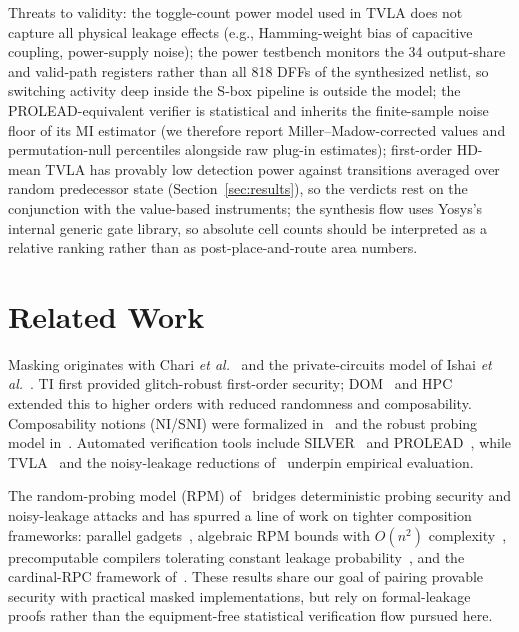 \documentclass[lettersize,journal]{IEEEtran}
\begin{document}
Threats to validity: the toggle-count power model used in TVLA does
not capture all physical leakage effects (e.g., Hamming-weight bias
of capacitive coupling, power-supply noise); the power testbench
monitors the 34 output-share and valid-path registers
rather than all 818 DFFs of the synthesized netlist, so
switching activity deep inside the S-box pipeline is outside the
model; the PROLEAD-equivalent
verifier is statistical and inherits the finite-sample noise floor of
its MI estimator (we therefore report Miller--Madow-corrected values
and permutation-null percentiles alongside raw plug-in estimates);
first-order HD-mean TVLA has provably low detection power against
transitions averaged over random predecessor state
(Section~\ref{sec:results}), so the verdicts rest on the conjunction
with the value-based instruments;
the synthesis flow uses Yosys's internal generic
gate library, so absolute cell counts should be interpreted as a
relative ranking rather than as post-place-and-route area numbers.

\section{Related Work}
\label{sec:related}
Masking originates with Chari \emph{et al.}~\cite{chari1999towards} and the
private-circuits model of Ishai \emph{et al.}~\cite{ishai2003private}. TI
\cite{nikova2006threshold} first provided glitch-robust first-order security;
DOM~\cite{gross2016dom} and HPC~\cite{cassiers2020hpc} extended this to higher
orders with reduced randomness and composability. Composability notions (NI/SNI)
were formalized in~\cite{barthe2016strong} and the robust probing model
in~\cite{faust2018composable}. Automated verification tools include
SILVER~\cite{knichel2020silver} and PROLEAD~\cite{muller2022prolead}, while
TVLA~\cite{goodwill2011tvla} and the noisy-leakage reductions
of~\cite{duc2014unifying} underpin empirical evaluation.

The random-probing model (RPM) of~\cite{belaid2020random} bridges
deterministic probing security and noisy-leakage attacks and has spurred
a line of work on tighter composition frameworks: parallel
gadgets~\cite{berti2023parallel}, algebraic RPM bounds
with $O(n^2)$ complexity~\cite{jahandideh2024algebraic}, precomputable
compilers tolerating constant leakage probability~\cite{wang2025precomputation},
and the cardinal-RPC framework
of~\cite{belaid2025cardinal}. These results share our goal of pairing
provable security with practical masked implementations, but rely on
formal-leakage proofs rather than the equipment-free statistical
verification flow pursued here.
\end{document}
